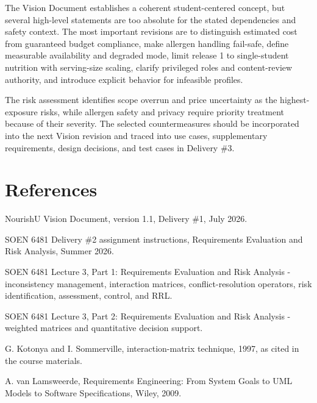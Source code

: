 \documentclass[11pt,a4paper]{article}
\begin{document}
The Vision Document establishes a coherent student-centered concept, but several high-level statements are too absolute for the stated dependencies and safety context. The most important revisions are to distinguish estimated cost from guaranteed budget compliance, make allergen handling fail-safe, define measurable availability and degraded mode, limit release 1 to single-student nutrition with serving-size scaling, clarify privileged roles and content-review authority, and introduce explicit behavior for infeasible profiles.

The risk assessment identifies scope overrun and price uncertainty as the highest-exposure risks, while allergen safety and privacy require priority treatment because of their severity. The selected countermeasures should be incorporated into the next Vision revision and traced into use cases, supplementary requirements, design decisions, and test cases in Delivery \#3.

\section*{References}


\begin{enumerate}[label={[\arabic*]},leftmargin=2.2em]

\item NourishU Vision Document, version 1.1, Delivery \#1, July 2026.

\item SOEN 6481 Delivery \#2 assignment instructions, Requirements Evaluation and Risk Analysis, Summer 2026.

\item SOEN 6481 Lecture 3, Part 1: Requirements Evaluation and Risk Analysis - inconsistency management, interaction matrices, conflict-resolution operators, risk identification, assessment, control, and RRL.

\item SOEN 6481 Lecture 3, Part 2: Requirements Evaluation and Risk Analysis - weighted matrices and quantitative decision support.

\item G. Kotonya and I. Sommerville, interaction-matrix technique, 1997, as cited in the course materials.

\item A. van Lamsweerde, Requirements Engineering: From System Goals to UML Models to Software Specifications, Wiley, 2009.

\end{enumerate}
\end{document}
